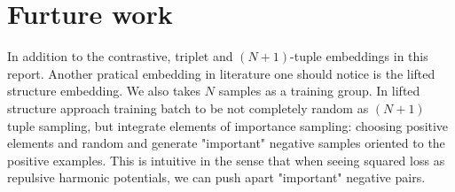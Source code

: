 \documentclass[10pt,twocolumn,letterpaper]{article}
\begin{document}
	\section{Furture work}
	In addition to the contrastive, triplet and $(N+1)$-tuple embeddings in this report. Another pratical embedding in literature one should notice is the lifted structure embedding. We also takes $N$ samples as a training group. In lifted structure approach training batch to be not completely random as $(N+1)$ tuple sampling, but integrate elements of importance sampling: choosing positive elements and random and generate "important" negative samples oriented to the positive examples. This is intuitive in the sense that when seeing squared loss as repulsive harmonic potentials, we can push apart "important" negative pairs. 
				\begin{figure}[t]
				

\end{figure}
\end{document}
